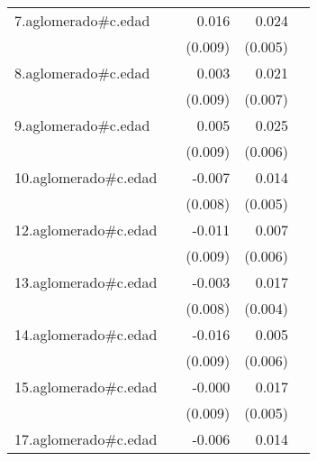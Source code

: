 {\begin{longtable}{l*{4}{D{.}{.}{-1}}}
\addlinespace
7.aglomerado#c.edad&                     &       0.016         &       0.024\sym{***}&                     \\
            &                     &     (0.009)         &     (0.005)         &                     \\
\addlinespace
8.aglomerado#c.edad&                     &       0.003         &       0.021\sym{**} &                     \\
            &                     &     (0.009)         &     (0.007)         &                     \\
\addlinespace
9.aglomerado#c.edad&                     &       0.005         &       0.025\sym{***}&                     \\
            &                     &     (0.009)         &     (0.006)         &                     \\
\addlinespace
10.aglomerado#c.edad&                     &      -0.007         &       0.014\sym{**} &                     \\
            &                     &     (0.008)         &     (0.005)         &                     \\
\addlinespace
12.aglomerado#c.edad&                     &      -0.011         &       0.007         &                     \\
            &                     &     (0.009)         &     (0.006)         &                     \\
\addlinespace
13.aglomerado#c.edad&                     &      -0.003         &       0.017\sym{***}&                     \\
            &                     &     (0.008)         &     (0.004)         &                     \\
\addlinespace
14.aglomerado#c.edad&                     &      -0.016         &       0.005         &                     \\
            &                     &     (0.009)         &     (0.006)         &                     \\
\addlinespace
15.aglomerado#c.edad&                     &      -0.000         &       0.017\sym{***}&                     \\
            &                     &     (0.009)         &     (0.005)         &                     \\
\addlinespace
17.aglomerado#c.edad&                     &      -0.006         &       0.014\sym{*}  &                     \\

\end{longtable}}

